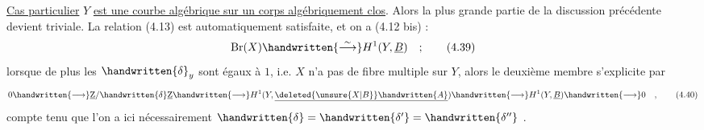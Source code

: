 \uline{Cas particulier}  $Y$ \uline{est une courbe algébrique sur un corps algébriquement clos}. Alors la  plus grande partie de la discussion précédente devient triviale. La relation (4.13) est automatiquement satisfaite, et on a (4.12 bis) :
\[
  \mathrm{Br}(X)\handwritten{\overset{\sim}{\longrightarrow}}H^{1}(Y,\underline B)\quad ; \tag*{(4.39)}
\]
lorsque de plus les $\handwritten{\delta}_{y}$ sont égaux à $1$, i.e.  $X$ n'a pas de fibre multiple sur $Y$, alors le deuxième membre s'explicite  par
\[
  0\handwritten{\longrightarrow}\underline{\mathrm Z}/\handwritten{\delta}\underline{\mathrm Z}
  \handwritten{\longrightarrow}H^{1}(Y,\underline{\deleted{\unsure{X|B}}\handwritten{A}})
  \handwritten{\longrightarrow}H^{1}(Y,\underline B)\handwritten{\longrightarrow}0\quad , \tag*{(4.40)}
\]
compte tenu que  l'on a ici nécessairement $\handwritten{\delta}=\handwritten{\delta'}=\handwritten{\delta''}$ .

